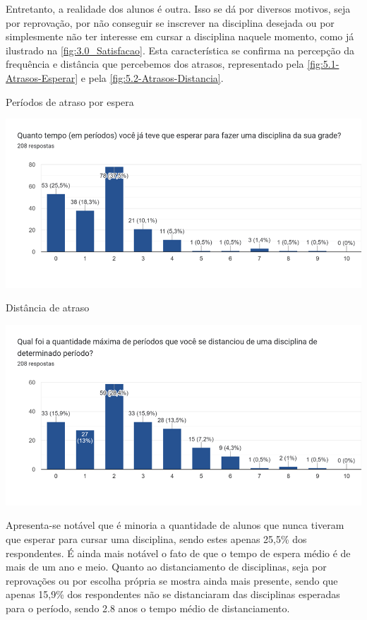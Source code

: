 Entretanto, a realidade dos alunos é outra. Isso se dá por diversos motivos, seja por reprovação, por não conseguir se inscrever na disciplina desejada ou por simplesmente não ter interesse em cursar a disciplina naquele momento, como já ilustrado na \autoref{fig:3.0_Satisfacao}. Esta característica se confirma na percepção da frequência e distância que percebemos dos atrasos, representado pela \autoref{fig:5.1-Atrasos-Esperar} e pela \autoref{fig:5.2-Atrasos-Distancia}.

\begin{MyCenteredFigure}
  \caption{Períodos de atraso por espera}
  \label{fig:5.1-Atrasos-Esperar}
  \includegraphics[width=\textwidth]{files/img/2.02!3-organizacao/2.02!3.1.4-forms/5.1-Atrasos-Esperar}
\end{MyCenteredFigure} %

\begin{MyCenteredFigure}
  \caption{Distância de atraso}
  \label{fig:5.2-Atrasos-Distancia}
  \includegraphics[width=\textwidth]{files/img/2.02!3-organizacao/2.02!3.1.4-forms/5.2-Atrasos-Distancia}
\end{MyCenteredFigure} %
Apresenta-se notável que é minoria a quantidade de alunos que nunca tiveram que esperar para cursar uma disciplina, sendo estes apenas 25,5\% dos respondentes. É ainda mais notável o fato de que o tempo de espera médio é de mais de um ano e meio. Quanto ao distanciamento de disciplinas, seja por reprovações ou por escolha própria se mostra ainda mais presente, sendo que apenas 15,9\% dos respondentes não se distanciaram das disciplinas esperadas para o período, sendo 2.8 anos o tempo médio de distanciamento.

